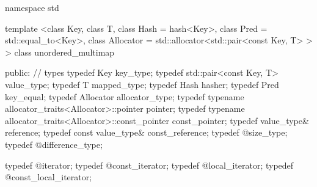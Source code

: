 %
\begin{codeblock}
namespace std {
  template <class Key,
            class T,
            class Hash = hash<Key>,
            class Pred = std::equal_to<Key>,
            class Allocator = std::allocator<std::pair<const Key, T> > >
  class unordered_multimap
  {
  public:
    // types
    typedef Key                                                 key_type;
    typedef std::pair<const Key, T>                             value_type;
    typedef T                                                   mapped_type;
    typedef Hash                                                hasher;
    typedef Pred                                                key_equal;
    typedef Allocator                                           allocator_type;
    typedef typename allocator_traits<Allocator>::pointer       pointer;
    typedef typename allocator_traits<Allocator>::const_pointer const_pointer;
    typedef value_type&                                         reference;
    typedef const value_type&                                   const_reference;
    typedef @\impdef@                              size_type;
    typedef @\impdef@                              difference_type;

    typedef @\impdef@                              iterator;
    typedef @\impdef@                              const_iterator;
    typedef @\impdef@                              local_iterator;
    typedef @\impdef@                              const_local_iterator;

}}
\end{codeblock}
